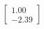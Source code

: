 \documentclass[preview]{standalone}
\begin{document}
\begin{align*}
\begin{bmatrix} 1.00 \\ -2.39 \end{bmatrix}
\end{align*}
\end{document}
